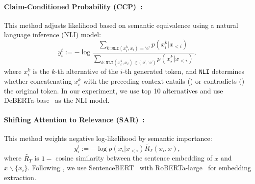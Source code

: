 \vspace{-0.1cm}
\paragraph{Claim-Conditioned Probability (CCP)~\citep{fadeeva-etal-2024-fact}:} This method adjusts likelihood based on semantic equivalence using a natural language inference (NLI) model:
 $$y^t_i:=-\log\frac{\sum_{k:\texttt{NLI}(x_i^k,x_i)=\text{`e'}}p(x_i^k|x_{<i})}{\sum_{k:\texttt{NLI}(x_i^k,x_i)\in\{\text{`e'}, \text{`c'}\}}p(x_i^k|x_{<i})},$$ where $x_i^k$ is the $k$-th alternative of the $i$-th generated token, and \texttt{NLI} determines whether concatenating $x_i^k$ with the preceding context entails () or contradicts () the original token. In our experiment, we use top 10 alternatives and use  DeBERTa-base~\citep{he2021deberta} as the NLI model.

\vspace{-0.1cm}
\paragraph{Shifting Attention to Relevance (SAR)~\citep{duan-etal-2024-shifting}:} This method weights negative log-likelihood by semantic importance:
$$y^t_i:=-\log p(x_i|x_{<i})\tilde{R_T}(x_i, x),$$ where $\tilde{R_T}$ is $1-$ cosine similarity between the sentence embedding of $x$ and $x\backslash \{x_i\}$. Following \citet{duan-etal-2024-shifting}, we use  SentenceBERT~\citep{reimers-gurevych-2019-sentence} with RoBERTa-large~\citep{liu2019robertarobustlyoptimizedbert} for embedding extraction.



\vspace{-0.1cm}
